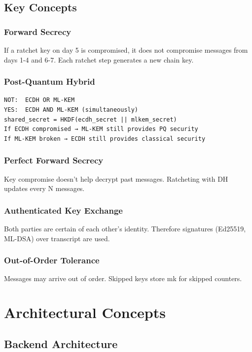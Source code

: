 \documentclass[11pt,a4paper,oneside]{book}
\begin{document}
\vspace{-0.3cm}\section{Key Concepts}
\vspace{-0.2cm}\subsection{Forward Secrecy}
If a ratchet key on day 5 is compromised, it does not compromise messages from days 1-4 and 6-7. Each ratchet step generates a new chain key.
\vspace{-0.2cm}\subsection{Post-Quantum Hybrid}
\begin{verbatim}
NOT:  ECDH OR ML-KEM
YES:  ECDH AND ML-KEM (simultaneously)
shared_secret = HKDF(ecdh_secret || mlkem_secret)
If ECDH compromised → ML-KEM still provides PQ security
If ML-KEM broken → ECDH still provides classical security
\end{verbatim}
\vspace{-0.2cm}\subsection{Perfect Forward Secrecy}
Key compromise doesn't help decrypt past messages. Ratcheting with DH updates every N messages.
\vspace{-0.2cm}\subsection{Authenticated Key Exchange}
Both parties are certain of each other's identity. Therefore signatures (Ed25519, ML-DSA) over transcript are used.
\vspace{-0.2cm}\subsection{Out-of-Order Tolerance}
Messages may arrive out of order. Skipped keys store mk for skipped counters.
\vspace{-0.5cm}\chapter{Architectural Concepts}
\vspace{-0.3cm}\section{Backend Architecture}
\end{document}
